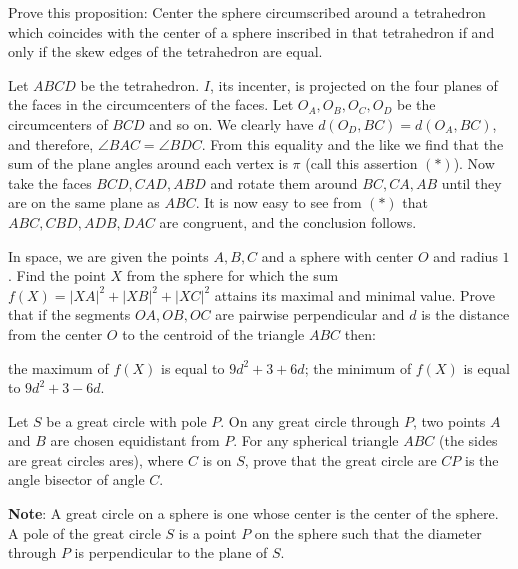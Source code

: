 \begin{question}[name={1967 IMO Longlist}]
	Prove this proposition: Center the sphere circumscribed around a tetrahedron which coincides with the center of a sphere inscribed in that tetrahedron if and only if the skew edges of the tetrahedron are equal.
\end{question}

\begin{solution}[name={Solution by Grobber}] 
	Let $ABCD$ be the tetrahedron. $I$, its incenter, is projected on the four planes of the faces in the circumcenters of the faces. Let $O_A,O_B,O_C,O_D$ be the circumcenters of $BCD$ and so on. We clearly have $d(O_D,BC)=d(O_A,BC)$, and therefore, $\angle BAC=\angle BDC$. From this equality and the like we find that the sum of the plane angles around each vertex is $\pi$ (call this assertion $(*)$). Now take the faces $BCD,CAD,ABD$ and rotate them around $BC,CA,AB$ until they are on the same plane as $ABC$. It is now easy to see from $(*)$ that $ABC,CBD,ADB,DAC$ are congruent, and the conclusion follows.
\end{solution}


\begin{question}[name={1970 Bulgaria}]
	In space, we are given the points $A,B,C$ and a sphere with center $O$ and radius $1$. Find the point $X$ from the sphere for which the sum $f(X)=|XA|^2+|XB|^2+|XC|^2$ attains its maximal and minimal value. Prove that if the segments $OA,OB,OC$ are pairwise perpendicular and $d$ is the distance from the center $O$ to the centroid of the triangle $ABC$ then:
	\begin{tasks}
		\task the maximum of $f(X)$ is equal to $9d^2+3+6d$;
		\task the minimum of $f(X)$ is equal to $9d^2+3-6d$.
	\end{tasks}
\end{question}	



\begin{question}[name={1979 USAMO}]
	Let $S$ be a great circle with pole $P$. On any great circle through $P$, two points $A$ and $B$ are chosen equidistant from $P$. For any spherical triangle $ABC$ (the sides are great circles ares), where $C$ is on $S$, prove that the great circle are $CP$ is the angle bisector of angle $C$.
	
	\textbf{Note}: A great circle on a sphere is one whose center is the center of the sphere. A pole of the great circle $S$ is a point $P$ on the sphere such that the diameter through $P$ is perpendicular to the plane of $S$.
\end{question}

